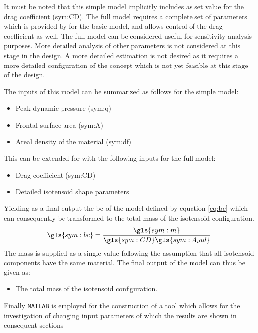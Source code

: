  It must be noted that this simple model implicitly includes as set value for the drag coefficient (\gls{sym:CD}). The full model requires a complete set of parameters which is provided by \cite{Anderson1969} for the basic model, and allows control of the drag coefficient as well. The full model can be considered useful for sensitivity analysis purposes. More detailed analysis of other parameters is not considered at this stage in the design. A more detailed estimation is not desired as it requires a more detailed configuration of the concept which is not yet feasible at this stage of the design.

The inputs of this model can be summarized as follows for the simple model:
\begin{itemize}
\item Peak dynamic pressure (\gls{sym:q})
\item Frontal surface area (\gls{sym:A})
\item Areal density of the material (\gls{sym:df})
\end{itemize}
This can be extended for with the following inputs for the full model:

\begin{itemize}
\item Drag coefficient (\gls{sym:CD})
\item Detailed isotensoid shape parameters
\end{itemize}

Yielding as a final output the \acrfull{bc} of the model defined by equation \ref{eq:bc} which can consequently be transformed to the total mass of the isotensoid configuration. 
\begin{equation}
\gls{sym:bc} = \frac{\gls{sym:m}}{\gls{sym:CD} \gls{sym:A_iad}}
\label{eq:bc}
\end{equation}
The mass is supplied as a single value following the assumption that all isotensoid components have the same material. The final output of the model can thus be given as:



\begin{itemize}
\item The total mass of the isotensoid configuration.
\end{itemize}

Finally \texttt{MATLAB} is employed for the construction of a tool which allows for the investigation of changing input parameters of which the results are shown in consequent sections.


